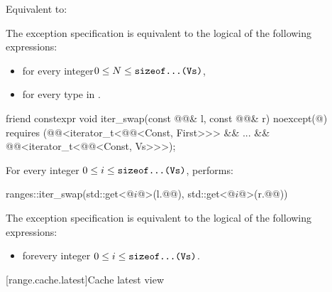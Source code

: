 \begin{itemdescr}
\pnum
\effects
Equivalent to: 

\pnum
\remarks
The exception specification is equivalent to
the logical  of the following expressions:
\begin{itemize}
\item
{}
for every integer\newline $0 \le N \le \tcode{sizeof...(Vs)}$,
\item
{}\newline
for every type  in .
\end{itemize}
\end{itemdescr}

%
\begin{itemdecl}
friend constexpr void iter_swap(const @@& l, const @@& r) noexcept(@\seebelow@)
  requires (@@<iterator_t<@@<Const, First>>> && ... &&
        @@<iterator_t<@@<Const, Vs>>>);
\end{itemdecl}

\begin{itemdescr}
\pnum
\effects
For every integer $0 \le i \le \tcode{sizeof...(Vs)}$, performs:
\begin{codeblock}
ranges::iter_swap(std::get<@$i$@>(l.@@), std::get<@$i$@>(r.@@))
\end{codeblock}

\pnum
\remarks
The exception specification is equivalent to the logical  of the following expressions:
\begin{itemize}
\item
{}
for\newline every integer $0 \le i \le \tcode{sizeof...(Vs)}$.
\end{itemize}
\end{itemdescr}

[range.cache.latest]{Cache latest view}

